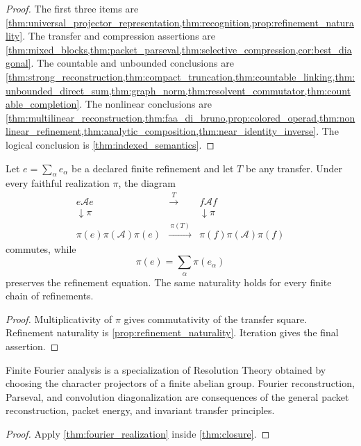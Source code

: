 \documentclass{aomart}
\theoremstyle{definition}
\theoremstyle{remark}
\newcommand{\Acal}{\mathcal A}
\begin{document}
\begin{proof}
The first three items are \cref{thm:universal_projector_representation,thm:recognition,prop:refinement_naturality}. The transfer and compression assertions are \cref{thm:mixed_blocks,thm:packet_parseval,thm:selective_compression,cor:best_diagonal}. The countable and unbounded conclusions are \cref{thm:strong_reconstruction,thm:compact_truncation,thm:countable_linking,thm:unbounded_direct_sum,thm:graph_norm,thm:resolvent_commutator,thm:countable_completion}. The nonlinear conclusions are \cref{thm:multilinear_reconstruction,thm:faa_di_bruno,prop:colored_operad,thm:nonlinear_refinement,thm:analytic_composition,thm:near_identity_inverse}. The logical conclusion is \cref{thm:indexed_semantics}.
\end{proof}

\begin{corollary}\label{cor:commuting_diagram}
Let \(e=\sum_\alpha e_\alpha\) be a declared finite refinement and let \(T\) be any transfer. Under every faithful realization \(\pi\), the diagram
\[
 \begin{array}{ccc}
 e\Acal e&\xrightarrow{\ T\ }&f\Acal f\\
 \downarrow\pi&&\downarrow\pi\\
 \pi(e)\pi(\Acal)\pi(e)&\xrightarrow{\ \pi(T)\ }&\pi(f)\pi(\Acal)\pi(f)
 \end{array}
\]
commutes, while
\[
 \pi(e)=\sum_\alpha\pi(e_\alpha)
\]
preserves the refinement equation. The same naturality holds for every finite chain of refinements.
\end{corollary}

\begin{proof}
Multiplicativity of \(\pi\) gives commutativity of the transfer square. Refinement naturality is \cref{prop:refinement_naturality}. Iteration gives the final assertion.
\end{proof}

\begin{corollary}\label{cor:fourier_specialization}
Finite Fourier analysis is a specialization of Resolution Theory obtained by choosing the character projectors of a finite abelian group. Fourier reconstruction, Parseval, and convolution diagonalization are consequences of the general packet reconstruction, packet energy, and invariant transfer principles.
\end{corollary}

\begin{proof}
Apply \cref{thm:fourier_realization} inside \cref{thm:closure}.
\end{proof}
\end{document}
